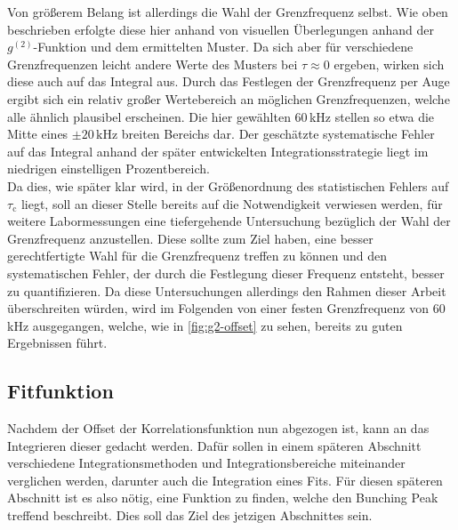 Von größerem Belang ist allerdings die Wahl der Grenzfrequenz selbst. 
Wie oben beschrieben erfolgte diese hier anhand von visuellen Überlegungen anhand der $g^{(2)}$-Funktion und dem ermittelten Muster. 
Da sich aber für verschiedene Grenzfrequenzen leicht andere Werte des Musters bei $\tau\approx 0$ ergeben, wirken sich diese auch auf das Integral aus. 
Durch das Festlegen der Grenzfrequenz per Auge ergibt sich ein relativ großer Wertebereich an möglichen Grenzfrequenzen, welche alle ähnlich plausibel erscheinen. 
Die hier gewählten 60\,kHz stellen so etwa die Mitte eines $\pm20\,\mathrm{kHz}$ breiten Bereichs dar. 
Der geschätzte systematische Fehler auf das Integral anhand der später entwickelten Integrationsstrategie liegt im niedrigen einstelligen Prozentbereich. \\

Da dies, wie später klar wird, in der Größenordnung des statistischen Fehlers auf $\tau_{\mathrm{c}}$ liegt, soll an dieser Stelle bereits auf die Notwendigkeit verwiesen werden, für weitere Labormessungen eine tiefergehende Untersuchung bezüglich der Wahl der Grenzfrequenz anzustellen. 
Diese sollte zum Ziel haben, eine besser gerechtfertigte Wahl für die Grenzfrequenz treffen zu können und den systematischen Fehler, der durch die Festlegung dieser Frequenz entsteht, besser zu quantifizieren. 
Da diese Untersuchungen allerdings den Rahmen dieser Arbeit überschreiten würden, wird im Folgenden von einer festen Grenzfrequenz von 60\,kHz ausgegangen, welche, wie in \autoref{fig:g2-offset} zu sehen, bereits zu guten Ergebnissen führt. 

\subsection{Fitfunktion}
\label{ssec:Fitfunktion}    
Nachdem der Offset der Korrelationsfunktion nun abgezogen ist, kann an das Integrieren dieser gedacht werden. 
Dafür sollen in einem späteren Abschnitt verschiedene Integrationsmethoden und Integrationsbereiche miteinander verglichen werden, darunter auch die Integration eines Fits. 
Für diesen späteren Abschnitt ist es also nötig, eine Funktion zu finden, welche den Bunching Peak treffend beschreibt. 
Dies soll das Ziel des jetzigen Abschnittes sein. 

